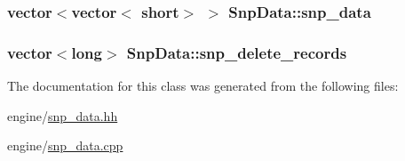 \label{classSnpData_afb0a89afa8922e9e20b4826ae5d5cd36}
\hypertarget{classSnpData_a485f4c48967669c1461fbed3ba32f98b}{
\subsubsection[{snp\_\-data}]{\setlength{\rightskip}{0pt plus 5cm}vector$<$vector$<$ short$>$ $>$ {\bf SnpData::snp\_\-data}}}
\label{classSnpData_a485f4c48967669c1461fbed3ba32f98b}
\hypertarget{classSnpData_ae90cb32821113584bc99241e760fdadb}{
\subsubsection[{snp\_\-delete\_\-records}]{\setlength{\rightskip}{0pt plus 5cm}vector$<$long$>$ {\bf SnpData::snp\_\-delete\_\-records}}}
\label{classSnpData_ae90cb32821113584bc99241e760fdadb}


The documentation for this class was generated from the following files:\begin{DoxyCompactItemize}
\item 
engine/\hyperlink{snp__data_8hh}{snp\_\-data.hh}\item 
engine/\hyperlink{snp__data_8cpp}{snp\_\-data.cpp}\end{DoxyCompactItemize}
